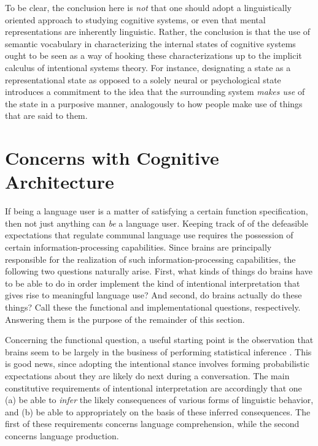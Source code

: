 To be clear, the conclusion here is \textit{not} that one should adopt a linguistically oriented approach to studying cognitive systems, or even that mental representations are inherently linguistic. Rather, the conclusion is that the use of semantic vocabulary in characterizing the internal states of cognitive systems ought to be seen as a way of hooking these characterizations up to the implicit calculus of intentional systems theory. For instance, designating a state as a representational state as opposed to a solely neural or psychological state introduces a commitment to the idea that the surrounding system \textit{makes use} of the state in a purposive manner, analogously to how people make use of things that are said to them. 

\section{Concerns with Cognitive Architecture}

If being a language user is a matter of satisfying a certain function specification, then not just anything can \textit{be} a language user. Keeping track of of the defeasible expectations that regulate communal language use requires the possession of certain information-processing capabilities. Since brains are principally responsible for the realization of such information-processing capabilities, the following two questions naturally arise. First, what kinds of things do brains have to be able to do in order implement the kind of intentional interpretation that gives rise to meaningful language use? And second, do brains actually do these things? Call these the functional and implementational questions, respectively. Answering them is the purpose of the remainder of this section. 

Concerning the functional question, a useful starting point is the observation that brains seem to be largely in the business of performing statistical inference \citep{Eliasmith:2007,clark:2013}. This is good news, since adopting the intentional stance involves forming probabilistic expectations about they are likely do next during a conversation. The main constitutive requirements of intentional interpretation are accordingly that one (a) be able to \textit{infer} the likely consequences of various forms of linguistic behavior, and (b) be able to  appropriately on the basis of these inferred consequences. The first of these requirements concerns language comprehension, while the second concerns language production. 

